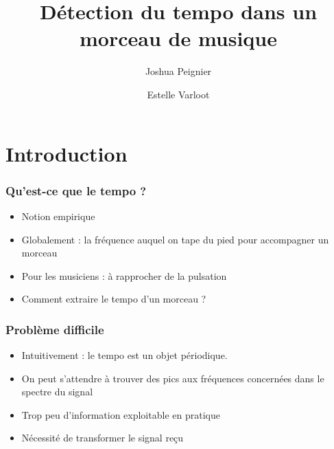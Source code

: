 \documentclass{beamer}
\title{\textbf{Détection du tempo dans un morceau de musique}}
\author{Joshua Peignier \and Estelle Varloot}
\begin{document}
\frame{\titlepage}

\begin{frame}
       \tableofcontents
\end{frame}


\section{Introduction}
\begin{frame}
       \tableofcontents[currentsection]
\end{frame}


\begin{frame}
 \frametitle{Qu'est-ce que le tempo ?}
 \begin{itemize}
  \item<2-> Notion empirique 
  \item<4-> Globalement : la fréquence auquel on tape du pied pour accompagner un morceau
  \item<5-> Pour les musiciens : à rapprocher de la pulsation
  \item<6-> Comment extraire le tempo d'un morceau ?
 \end{itemize}
\end{frame}

\begin{frame}
 \frametitle{Problème difficile}
 \begin{itemize}
  \item Intuitivement : le tempo est un objet périodique.
  \item<2-> On peut s'attendre à trouver des pics aux fréquences concernées dans le spectre du signal
  \item<3-> Trop peu d'information exploitable en pratique
  \item<4-> Nécessité de transformer le signal reçu
 \end{itemize}
\end{frame}
\end{document}
